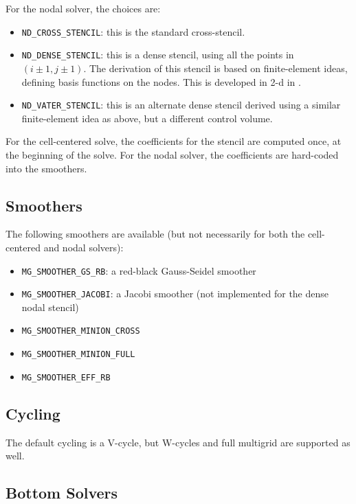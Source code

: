 For the nodal solver, the choices are:
\begin{itemize}
\item {\tt ND\_CROSS\_STENCIL}: this is the standard cross-stencil.

\item {\tt ND\_DENSE\_STENCIL}: this is a dense stencil, using
  all the points in $(i\pm1,j\pm1)$.  The 
  derivation of this stencil is based on finite-element ideas, defining
  basis functions on the nodes.  This is developed in 2-d in 
  \cite{almgrenBellSzymczak:1996}.

\item {\tt ND\_VATER\_STENCIL}: this is an alternate dense stencil derived
  using a similar finite-element idea as above, but a different control
  volume.
\end{itemize}
For the cell-centered solve, the coefficients for the stencil are computed
once, at the beginning of the solve.  For the nodal solver, the coefficients
are hard-coded into the smoothers.

\subsection{Smoothers}

The following smoothers are available (but not necessarily for both the
cell-centered and nodal solvers):
\begin{itemize}
\item {\tt MG\_SMOOTHER\_GS\_RB}: a red-black Gauss-Seidel smoother

\item {\tt MG\_SMOOTHER\_JACOBI}: a Jacobi smoother (not implemented for 
the dense nodal stencil)

\item {\tt MG\_SMOOTHER\_MINION\_CROSS}

\item {\tt MG\_SMOOTHER\_MINION\_FULL}

\item {\tt MG\_SMOOTHER\_EFF\_RB}
\end{itemize}



\subsection{Cycling}

The default cycling is a V-cycle, but W-cycles and full multigrid are
supported as well.


\subsection{Bottom Solvers}

